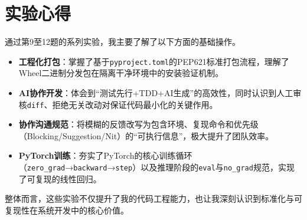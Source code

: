 \documentclass[12pt, a4paper]{ctexart}
\begin{document}
\section{实验心得}
通过第9至12题的系列实验，我主要了解了以下方面的基础操作。
\begin{itemize}
    \item \textbf{工程化打包}：掌握了基于\texttt{pyproject.toml}的PEP621标准打包流程，理解了Wheel二进制分发包在隔离干净环境中的安装验证机制。
    \item \textbf{AI协作开发}：体会到“测试先行+TDD+AI生成”的高效性，同时认识到人工审核\texttt{diff}、拒绝无关改动对保证代码最小化的关键作用。
    \item \textbf{协作沟通规范}：将模糊的反馈改写为包含环境、复现命令和优先级（Blocking/Suggestion/Nit）的“可执行信息”，极大提升了团队效率。
    \item \textbf{PyTorch训练}：夯实了PyTorch的核心训练循环（\texttt{zero\_grad}→\texttt{backward}→\texttt{step}）以及推理阶段的\texttt{eval}与\texttt{no\_grad}规范，实现了可复现的线性回归。
\end{itemize}
整体而言，这些实验不仅提升了我的代码工程能力，也让我深刻认识到标准化与可复现性在系统开发中的核心价值。
\end{document}
